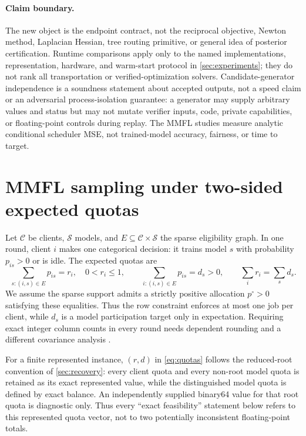 \documentclass[smallextended,envcountsect]{svjour3}
\newcommand{\cC}{\mathcal{C}}
\newcommand{\cS}{\mathcal{S}}
\begin{document}
\paragraph{Claim boundary.}
The new object is the endpoint contract, not the reciprocal objective, Newton
method, Laplacian Hessian, tree routing primitive, or general idea of posterior
certification.  Runtime comparisons apply only to the named implementations,
representation, hardware, and warm-start protocol in \cref{sec:experiments};
they do not rank all transportation or verified-optimization solvers.
Candidate-generator independence is a soundness statement about accepted
outputs, not a speed claim or an adversarial process-isolation guarantee: a
generator may supply arbitrary values and status but may not mutate verifier
inputs, code, private capabilities, or floating-point controls during replay.
The MMFL studies measure analytic conditional scheduler MSE, not trained-model
accuracy, fairness, or time to target.

\section{MMFL sampling under two-sided expected quotas}
\label{sec:mmfl}

Let $\cC$ be clients, $\cS$ models, and
$E\subseteq\cC\times\cS$ the sparse eligibility graph.  In one round, client
$i$ makes one categorical decision: it trains model $s$ with probability
$p_{is}>0$ or is idle.  The expected quotas are
\begin{equation}
 \sum_{s:(i,s)\in E}p_{is}=r_i,\quad 0<r_i\le1,
 \qquad
 \sum_{i:(i,s)\in E}p_{is}=d_s>0,
 \qquad \sum_i r_i=\sum_s d_s.
 \label{eq:quotas}
\end{equation}
We assume the sparse support admits a strictly positive allocation
$p^\circ>0$ satisfying these equalities.
Thus the row constraint enforces at most one job per client, while $d_s$ is a
model participation target only in expectation.  Requiring exact integer column
counts in every round needs dependent rounding and a different covariance
analysis \citep{gandhi2006rounding}.

For a finite represented instance, $(r,d)$ in \cref{eq:quotas} follows the
reduced-root convention of \cref{sec:recovery}: every client quota and every
non-root model quota is retained as its exact represented value, while the
distinguished model quota is defined by exact balance.  An independently
supplied binary64 value for that root quota is diagnostic only.  Thus every
``exact feasibility'' statement below refers to this represented quota vector,
not to two potentially inconsistent floating-point totals.
\end{document}
